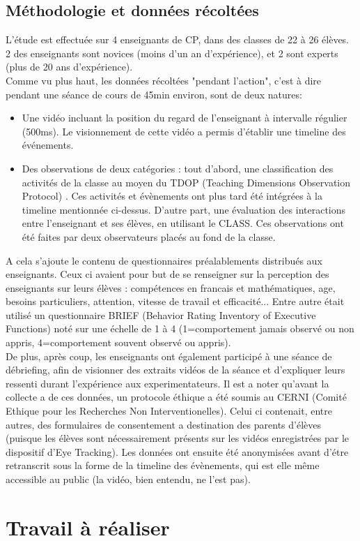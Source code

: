 \documentclass{article}
\begin{document}
\subsection{Méthodologie et données récoltées}
L'étude est effectuée sur 4 enseignants de CP, dans des classes de 22 à 26 élèves. 2 des enseignants sont novices (moins d'un an d'expérience), et 2 sont experts (plus de 20 ans d'expérience).\\
Comme vu plus haut, les données récoltées "pendant l'action", c'est à dire pendant une séance de cours de 45min environ, sont de deux natures:
\begin{itemize}
  \item Une vidéo incluant la position du regard de l'enseignant à intervalle régulier (500ms). Le visionnement de cette vidéo a permis d'établir une timeline des événements.
  \item Des observations de deux catégories : tout d'abord, une classification des activités de la classe au moyen du TDOP (Teaching Dimensions Observation Protocol) \cite{TDOP}. Ces activités et évènements ont plus tard été intégrées à la timeline mentionnée ci-dessus. D'autre part, une évaluation des interactions entre l'enseignant et ses élèves, en utilisant le CLASS. Ces observations ont été faites par deux observateurs placés au fond de la classe.
\end{itemize}
A cela s'ajoute le contenu de questionnaires préalablements distribués aux enseignants. Ceux ci avaient pour but de se renseigner sur la perception des enseignants sur leurs élèves : compétences en francais et mathématiques, age, besoins particuliers, attention, vitesse de travail et efficacité... Entre autre était utilisé un questionnaire BRIEF (Behavior Rating Inventory of Executive Functions) noté sur une échelle de 1 à 4 (1=comportement jamais observé ou non appris, 4=comportement souvent observé ou appris).\\
De plus, après coup, les enseignants ont également participé à une séance de débriefing, afin de visionner des extraits vidéos de la séance et d'expliquer leurs ressenti durant l'expérience aux experimentateurs.
Il est a noter qu'avant la collecte a de ces données, un protocole éthique a été soumis au CERNI (Comité Ethique pour les Recherches Non Interventionelles). Celui ci contenait, entre autres, des formulaires de consentement a destination des parents d'élèves (puisque les élèves sont nécessairement présents sur les vidéos enregistrées par le dispositif d'Eye Tracking). Les données ont ensuite été anonymisées avant d'étre retranscrit sous la forme de la timeline des évènements, qui est elle même accessible au public (la vidéo, bien entendu, ne l'est pas).

\section{Travail à réaliser}

{}

\end{document}
